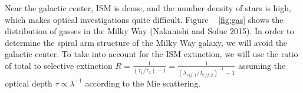 \documentclass[letterpaper,11pt]{article}
\begin{document}

Near the galactic center, ISM is dense, and the number density of stars is high, which makes optical investigations quite difficult. Figure ~ \ref{fig:gas} shows the distribution of gasses in the Milky Way (Nakanishi and Sofue 2015). In order to determine the spiral arm structure of the Milky Way galaxy, we will avoid the galactic center. To take into account for the ISM extinction, we will use the ratio of total to selective extinction $R = \frac{1}{(\tau_{1} / \tau_{2}) -1} = \frac{1}{(\lambda_{eff,1} / \lambda_{eff,2})^{-1} \, -1}$ assuming the optical depth $\tau \propto \lambda^{-1}$ according to the Mie scattering. 
\end{document}
